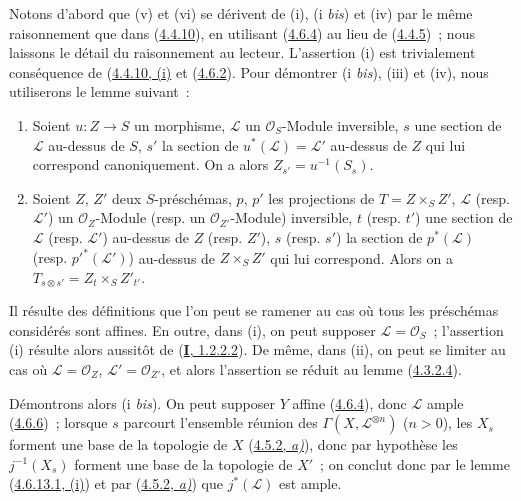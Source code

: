 Notons d'abord que (v) et (vi) se dérivent de (i), (i \emph{bis}) et (iv) par le
même raisonnement que dans (\hyperref[II.4.4.10-fr]{4.4.10}), en utilisant
(\hyperref[II.4.6.4-fr]{4.6.4}) au lieu de
(\hyperref[II.4.4.5-fr]{4.4.5})~; nous laissons le détail du raisonnement au
lecteur. L'assertion (i) est trivialement conséquence de
(\hyperref[II.4.4.10-fr]{4.4.10, (i)} et
(\hyperref[II.4.6.2-fr]{4.6.2}). Pour démontrer (i \emph{bis}), (iii) et (iv), nous
utiliserons le lemme suivant~:

\begin{lemma}[4.6.13.1]
\label{II.4.6.13.1-fr}
\begin{enumerate}
  \item[\rm{(i)}] Soient $u:Z\to S$ un morphisme, $\mathcal{L}$ un
  $\mathcal{O}_S$-Module inversible, $s$ une section de $\mathcal{L}$
  au-dessus de $S$, $s'$ la section de $u^*(\mathcal{L})=\mathcal{L}'$
  au-dessus de $Z$ qui lui correspond canoniquement. On a alors
  $Z_{s'}=u^{-1}(S_s)$.
  \item[\rm{(ii)}] Soient $Z$, $Z'$ deux $S$-préschémas, $p$, $p'$ les
  projections de $T=Z\times_S Z'$, $\mathcal{L}$ \textup{(resp.
  $\mathcal{L}'$)} un $\mathcal{O}_Z$-Module \textup{(resp.} un
  $\mathcal{O}_{Z'}$-Module\textup{)} inversible, $t$ \textup{(resp. $t'$)} une section de
  $\mathcal{L}$ \textup{(resp. $\mathcal{L}'$)} au-dessus de $Z$ \textup{(resp. $Z'$)}, $s$
  \textup{(resp. $s'$)} la section de $p^*(\mathcal{L})$ \textup{(resp.
  $p'^*(\mathcal{L}')$)} au-dessus de $Z\times_S Z'$ qui lui correspond.
  Alors on a $T_{s\otimes s'}=Z_t\times_S Z'_{t'}$.
\end{enumerate}
\end{lemma}

Il résulte des définitions que l'on peut se ramener au cas où tous les
préschémas considérés sont affines. En outre, dans (i), on peut supposer
$\mathcal{L}=\mathcal{O}_S$~; l'assertion (i) résulte alors aussitôt de
(\hyperref[I.1.2.2.2-fr]{\textbf{I}, 1.2.2.2}). De même, dans (ii), on peut se
limiter au cas où $\mathcal{L}=\mathcal{O}_Z$,
$\mathcal{L}'=\mathcal{O}_{Z'}$, et alors l'assertion se réduit au lemme
(\hyperref[II.4.3.2.4-fr]{4.3.2.4}).

Démontrons alors (i \emph{bis}). On peut supposer $Y$ affine
(\hyperref[II.4.6.4-fr]{4.6.4}), donc $\mathcal{L}$ ample
(\hyperref[II.4.6.6-fr]{4.6.6})~; lorsque $s$ parcourt l'ensemble réunion
des $\Gamma(X,\mathcal{L}^{\otimes n})$ ($n>0$), les $X_s$ forment une
base de la topologie de $X$ (\hyperref[II.4.5.2-fr]{4.5.2, \emph{a)}}), donc par
hypothèse les $j^{-1}(X_s)$ forment une base de la topologie de $X'$~; on
conclut donc par le lemme
(\hyperref[II.4.6.13.1-fr]{4.6.13.1, (i)}) et par
(\hyperref[II.4.5.2-fr]{4.5.2, \emph{a)}}) que $j^*(\mathcal{L})$ est ample.

